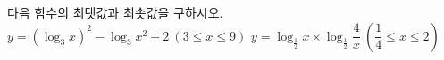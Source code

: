 다음 함수의 최댓값과 최솟값을 구하시오.
 $y=(\log_3 x)^2-\log_3 x^2+2\ (3\le x\le 9)$
 $y=\log_{\frac{1}{2}} x\times\log_{\frac{1}{2}} \dfrac{4}{x}\ \left(\dfrac{1}{4}\le x\le 2\right)$
